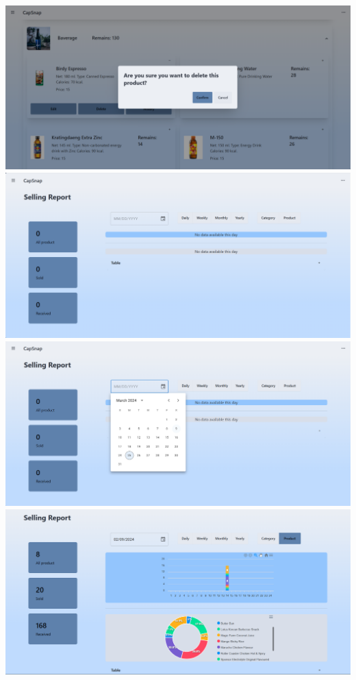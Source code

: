 {
\includegraphics[scale=0.35]{pic/ui/w14.png}
}\\
{
\includegraphics[scale=0.35]{pic/ui/w15.png}
}\\
{
\includegraphics[scale=0.35]{pic/ui/w16.png}
}\\
{
\includegraphics[scale=0.35]{pic/ui/w17.png}
}\\
